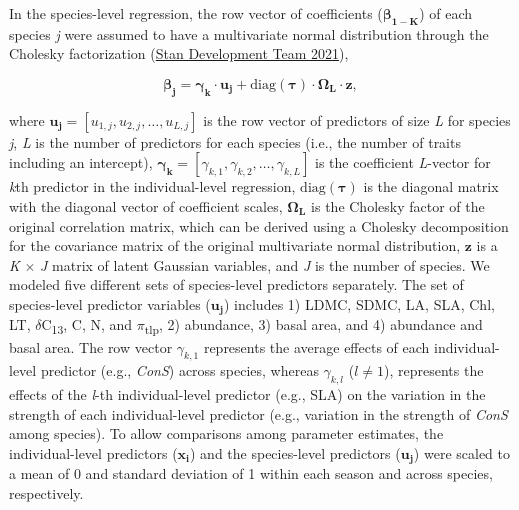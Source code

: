 \documentclass[
  12pt,
  letterpaper,
  DIV=11,
  numbers=noendperiod]{scrartcl}
\begin{document}
In the species-level regression, the row vector of coefficients
(\(\boldsymbol{\beta_{1-K}}\)) of each species \emph{j} were assumed to
have a multivariate normal distribution through the Cholesky
factorization (\protect\hyperlink{ref-StanDevelopmentTeam2021}{Stan
Development Team 2021}),

\[
\boldsymbol{\beta_j} = \boldsymbol{\gamma_k} \cdot \boldsymbol{u_j} + \mathrm{diag}(\boldsymbol{\tau})\cdot \boldsymbol{\Omega_L} \cdot \boldsymbol{z},
\]

where
\(\boldsymbol{u_{j}} = \left[u_{1,j}, u_{2,j}, \ldots, u_{L,j} \right]\)
is the row vector of predictors of size \emph{L} for species \emph{j},
\emph{L} is the number of predictors for each species (i.e., the number
of traits including an intercept),
\(\boldsymbol{\gamma_k} = \left[\gamma_{k,1}, \gamma_{k,2}, \ldots, \gamma_{k,L} \right]\)
is the coefficient \emph{L}-vector for \emph{k}th predictor in the
individual-level regression, \(\mathrm{diag}(\boldsymbol{\tau})\) is the
diagonal matrix with the diagonal vector of coefficient scales,
\(\boldsymbol{\Omega_L}\) is the Cholesky factor of the original
correlation matrix, which can be derived using a Cholesky decomposition
for the covariance matrix of the original multivariate normal
distribution, \(\boldsymbol{z}\) is a \emph{K} \(\times\) \emph{J}
matrix of latent Gaussian variables, and \emph{J} is the number of
species. We modeled five different sets of species-level predictors
separately. The set of species-level predictor variables
(\(\boldsymbol{u_j}\)) includes 1) LDMC, SDMC, LA, SLA, Chl, LT,
\(\delta\)C\textsubscript{13}, C, N, and \(\pi\)\textsubscript{tlp}, 2)
abundance, 3) basal area, and 4) abundance and basal area. The row
vector \(\gamma_{k,1}\) represents the average effects of each
individual-level predictor (e.g., \emph{ConS}) across species, whereas
\(\gamma_{k, l}\) (\(l \ne 1\)), represents the effects of the
\emph{l}-th individual-level predictor (e.g., SLA) on the variation in
the strength of each individual-level predictor (e.g., variation in the
strength of \emph{ConS} among species). To allow comparisons among
parameter estimates, the individual-level predictors
(\(\boldsymbol{x_i}\)) and the species-level predictors
(\(\boldsymbol{u_j}\)) were scaled to a mean of 0 and standard deviation
of 1 within each season and across species, respectively.
\end{document}
